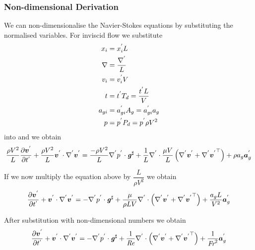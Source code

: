 \subsubsection{Non-dimensional Derivation}
We can non-dimensionalise the Navier-Stokes equations by substituting the normalised variables. For inviscid flow we substitute
\begin{align}
  x_{i} &=  {x}^{'} _{i}L \\
   \nabla  &= \dfrac{  {\nabla}^{'}  }{L} \\
  v_{i} &=  {v}^{'} _{i}V \\
  t &=  {t}^{'} T_{d}=\dfrac{ {t}^{'} L}{V}\\
  a_{gi} &=  {a}^{'} _{gi}A_{g}= {a}^{'} _{gi}a_{g}\\
  p &=  {p}^{'} P_{d}= {p}^{'} \rho V^{2}
\end{align}
into  and  we obtain
\begin{equation}
  \dfrac{\rho V^{2}}{L}\delby{\nondim{\vectr{v}}}{\nondim{t}}
  +\dotprod{\dfrac{\rho V^{2}}{L}\nondim{\vectr{v}}}{\gradientnondim{}{\nondim{\vectr{v}}}}
  =\dotprod{\dfrac{-\rho V^{2}}{L}\gradientnondim{}{\nondim{p}}}{\sharptensor{\tensor{g}}}
  +\dfrac{1}{L}\divergencenondim{}{\dfrac{\mu V}{L}\pbrac{\gradientnondim{}{\nondim{\vectr{v}}+
        \transpose{\gradientnondim{}{\nondim{\vectr{v}}}}}}}
  +\rho a_{g}\nondim{\vectr{a}}_{g}
\end{equation}

If we now multiply the equation above by $\dfrac{L}{\rho V^{2}}$ we obtain
\begin{equation}
  \delby{\nondim{\vectr{v}}}{\nondim{t}}+\dotprod{\nondim{\vectr{v}}}{\gradientnondim{}{\nondim{\vectr{v}}}}
  =\dotprod{-\gradientnondim{}{\nondim{p}}}{\sharptensor{\tensor{g}}}
  +\dfrac{\mu}{\rho L V}\divergencenondim{}{\pbrac{\gradientnondim{}{\nondim{\vectr{v}}+
        \transpose{\gradientnondim{}{\nondim{\vectr{v}}}}}}}
  +\dfrac{a_{g}L}{V^{2}}\nondim{\vectr{a}}_{g}
\end{equation}

After substitution with non-dimensional numbers we obtain
\begin{equation}
  \delby{\nondim{\vectr{v}}}{\nondim{t}}+\dotprod{\nondim{\vectr{v}}}{\gradientnondim{}{\nondim{\vectr{v}}}}
  =\dotprod{-\gradientnondim{}{\nondim{p}}}{\sharptensor{\tensor{g}}}+
  \dfrac{1}{\reynoldsnum}\divergencenondim{}{\pbrac{\gradientnondim{}{\nondim{\vectr{v}}+
        \transpose{\gradientnondim{}{\nondim{\vectr{v}}}}}}}
  +\dfrac{1}{\froudenum^{2}}\nondim{\vectr{a}}_{g}
\end{equation}

